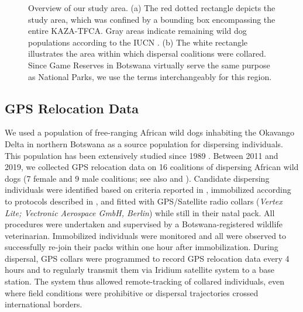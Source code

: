 \documentclass[abstract=on,10pt,a4paper,bibliography=totocnumbered]{article}
\begin{document}
\begin{figure}[h]
  \begin{center}
    \caption{Overview of our study area. (a) The red dotted rectangle depicts
    the study area, which was confined by a bounding box encompassing the entire
    KAZA-TFCA. Gray areas indicate remaining wild dog populations according to
    the IUCN \citep{Woodroffe.2012}. (b) The white rectangle illustrates the
    area within which dispersal coalitions were collared. Since Game Reserves in
    Botswana virtually serve the same purpose as National Parks, we use the
    terms interchangeably for this region.}
    \label{StudyArea}
  \end{center}
\end{figure}


\subsection{GPS Relocation Data}
We used a population of free-ranging African wild dogs inhabiting the Okavango
Delta in northern Botswana as a source population for dispersing individuals.
This population has been extensively studied since 1989 \citep{McNutt.1996,
McNutt.2008, Cozzi.2013, Cozzi.2020, Behr.2020}. Between 2011 and 2019, we
collected GPS relocation data on 16 coalitions of dispersing African wild dogs
(7 female and 9 male coalitions; see also \cite{Abrahms.2017} and
\cite{Cozzi.2020}). Candidate dispersing individuals were identified based on
criteria reported in \cite{Behr.2020}, immobilized according to protocols
described in \cite{Osofsky.1996}, and fitted with GPS/Satellite radio collars
(\textit{Vertex Lite; Vectronic Aerospace GmbH, Berlin}) while still in their
natal pack. All procedures were undertaken and supervised by a
Botswana-registered wildlife veterinarian. Immobilized individuals were
monitored and all were observed to successfully re-join their packs within one
hour after immobilization. During dispersal, GPS collars were programmed to
record GPS relocation data every 4 hours and to regularly transmit them via
Iridium satellite system to a base station. The system thus allowed
remote-tracking of collared individuals, even where field conditions were
prohibitive or dispersal trajectories crossed international borders.
\end{document}
